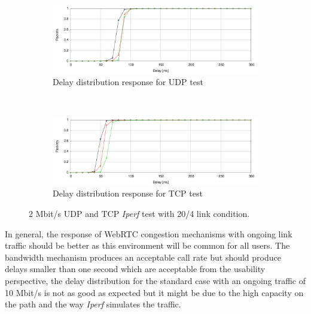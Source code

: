 \begin{figure}[h]
        \centering
        \begin{subfigure}[b]{0.5\textwidth}
                \centering
                \includegraphics[width=\textwidth]{./figures/2m_udp_total_delay_distribution.pdf}
                \caption{Delay distribution response for UDP test}
                \label{fig:2m_udp_total_delay_distribution}
        \end{subfigure}%
        ~ %
        \begin{subfigure}[b]{0.5\textwidth}
                \centering
                \includegraphics[width=\textwidth]{./figures/2m_tcp_total_delay_distribution.pdf}
                \caption{Delay distribution response for TCP test}
                \label{fig:2m_tcp_total_delay_distribution}
        \end{subfigure}
        \caption[2 Mbit/s UDP and TCP {\it Iperf} test with 20/4 link condition]{2 Mbit/s UDP and TCP {\it Iperf} test with 20/4 link condition.}
        \label{fig:2m_tcp_udp_distribution}
\end{figure}

In general, the response of WebRTC congestion mechanisms with ongoing link traffic should be better as this environment will be common for all users. The bandwidth mechanism produces an acceptable call rate but should produce delays smaller than one second which are acceptable from the usability perspective, the delay distribution for the standard case with an ongoing traffic of 10 Mbit/s is not as good as expected but it might be due to the high capacity on the path and the way {\it Iperf} simulates the traffic.

